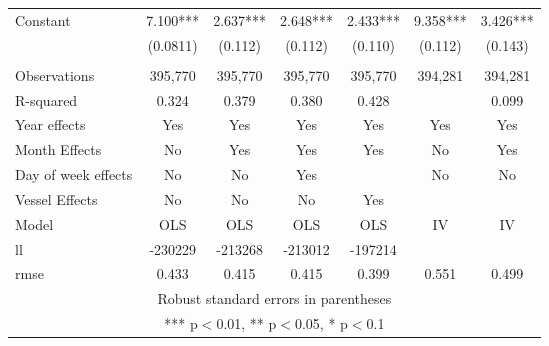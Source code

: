 \begin{tabular}{lcccccc}
Constant & 7.100*** & 2.637*** & 2.648*** & 2.433*** & 9.358*** & 3.426*** \\
 & (0.0811) & (0.112) & (0.112) & (0.110) & (0.112) & (0.143) \\
 &  &  &  &  &  &  \\
Observations & 395,770 & 395,770 & 395,770 & 395,770 & 394,281 & 394,281 \\
R-squared & 0.324 & 0.379 & 0.380 & 0.428 &  & 0.099 \\
Year effects & Yes & Yes & Yes & Yes & Yes & Yes \\
Month Effects & No & Yes & Yes & Yes & No & Yes \\
Day of week effects & No & No & Yes &  & No & No \\
Vessel Effects & No & No & No & Yes &  &  \\
Model & OLS & OLS & OLS & OLS & IV & IV \\
ll & -230229 & -213268 & -213012 & -197214 &  &  \\
 rmse & 0.433 & 0.415 & 0.415 & 0.399 & 0.551 & 0.499 \\ \hline
\multicolumn{7}{c}{ Robust standard errors in parentheses} \\
\multicolumn{7}{c}{ *** p$<$0.01, ** p$<$0.05, * p$<$0.1} \\
\end{tabular}
